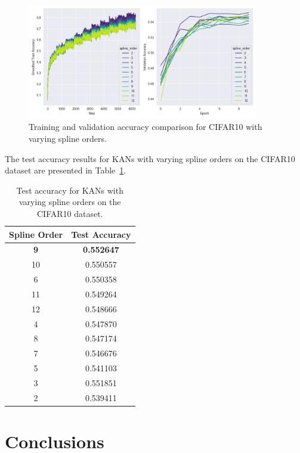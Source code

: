 \documentclass{article}
\begin{document}
\begin{figure}[H]
    \centering
    \includegraphics[width=0.9\textwidth]{pics/cifar10_accuracy_spline_order}
    \caption{Training and validation accuracy comparison for CIFAR10 with varying spline orders.}
    \label{fig:cifar10_accuracy_spline_order}
\end{figure}


The test accuracy results for KANs with varying spline orders on the CIFAR10 dataset are presented in Table~\ref{tab:test_accuracy_spline_order_cifar10}.

\begin{table}[H]
    \centering
    \caption{Test accuracy for KANs with varying spline orders on the CIFAR10 dataset.}
    \label{tab:test_accuracy_spline_order_cifar10}
    \begin{tabular}{|c|c|}
        \hline
        Spline Order & Test Accuracy \\
        \hline
        \textbf{9}  & \textbf{0.552647} \\
        10 & 0.550557 \\
        6  & 0.550358 \\
        11 & 0.549264 \\
        12 & 0.548666 \\
        4  & 0.547870 \\
        8  & 0.547174 \\
        7  & 0.546676 \\
        5  & 0.541103 \\
        3  & 0.551851 \\
        2  & 0.539411 \\
        \hline
    \end{tabular}
\end{table}


\section{Conclusions}\label{sec:conclusions}
\end{document}
